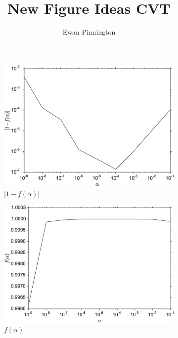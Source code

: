 \documentclass[11pt]{article}
\title{New Figure Ideas CVT}
\author{Ewan Pinnington}
\begin{document}
\maketitle

\begin{figure}
    \centering
    \begin{subfigure}[b]{0.49\textwidth}
        \includegraphics[width=\textwidth]{cost.eps}
        \caption{$|1-f(\alpha)|$}
        \label{fig:4dvardiagBR}
    \end{subfigure}
    \begin{subfigure}[b]{0.49\textwidth}
        \includegraphics[width=\textwidth]{costone.eps}
        \caption{$f(\alpha)$}
        \label{fig:4dvaredcBR}
    \end{subfigure}
    \begin{subfigure}[b]{0.49\textwidth}

\end{subfigure}
\end{figure}
\end{document}
